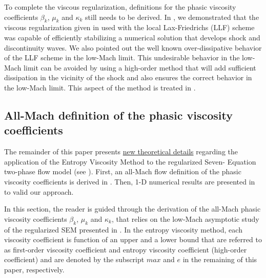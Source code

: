 \documentclass[preprint,10pt]{elsarticle}
\begin{document}
To complete the viscous regularization, definitions for the phasic viscosity coefficients $\beta_k$, $\mu_k$ and $\kappa_k$ still needs to be derived. In \cite{Marco_paper_sem}, we demonstrated that the viscous regularization given in  used with the local Lax-Friedrichs (LLF) scheme was capable of efficiently stabilizing a numerical solution that develops shock and discontinuity waves. We also pointed out the well known over-dissipative behavior of the LLF scheme in the low-Mach limit. This undesirable behavior in the low-Mach limit can be avoided by using a high-order method that will add sufficient dissipation in the vicinity of the shock and also ensures the correct behavior in the low-Mach limit. This aspect of the method is treated in .
%  

 
%
\subsection{All-Mach definition of the phasic viscosity coefficients}\label{sec:visc-def}
%
 
%
The remainder of this paper presents \underline{new theoretical details} regarding the application of the Entropy Viscosity Method to the regularized Seven-
Equation two-phase flow model (see ). 
First, an all-Mach flow definition of the phasic viscosity coefficients is derived in . Then, 1-D numerical results are presented in 
 to valid our approach.

In this section, the reader is guided through the derivation of the all-Mach phasic viscosity coefficients $\beta_k$, $\mu_k$ and $\kappa_k$, that relies on the 
low-Mach asymptotic study of the regularized SEM 
presented in \cite{Marco_paper_sem}. In the entropy viscosity method, each viscosity coefficient is function of an upper and a lower bound that are referred to as first-order 
viscosity coefficient and entropy viscosity coefficient (high-order coefficient) 
and are denoted by the subscript $max$ and $e$ in the remaining of this paper, respectively. 
%
\end{document}
